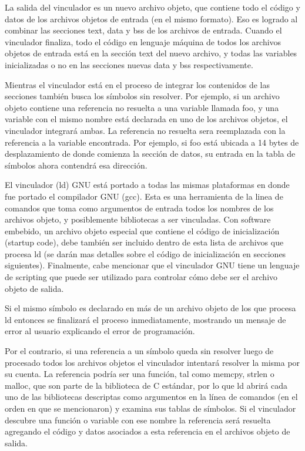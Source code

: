 \documentclass[12pt]{article}
\begin{document}
La salida del vinculador es un nuevo archivo objeto, que contiene todo el código y datos
de los archivos objetos de entrada (en el mismo formato).
Eso es logrado al combinar las secciones text, data y bss de los archivos de entrada.
Cuando el vinculador finaliza, todo el código en lenguaje máquina de todos los archivos
objetos de entrada está en la sección text del nuevo archivo, y todas las variables
inicializadas o no en las secciones nuevas data y bss respectivamente.

Mientras el vinculador está en el proceso de integrar 
los contenidos de las secciones también 
busca los símbolos sin resolver. Por ejemplo, si un archivo objeto contiene 
una referencia no resuelta a  una variable llamada foo, y una variable con 
el mismo nombre está declarada en uno de los archivos objetos, el vinculador
integrará ambas. La referencia no resuelta sera reemplazada con la referencia
a la variable encontrada. Por ejemplo, si foo está ubicada a 14 bytes de desplazamiento
de donde comienza la sección de datos, su entrada en la tabla de símbolos ahora
contendrá esa dirección.

El vinculador (ld) GNU está portado a todas las mismas plataformas en donde
fue portado el compilador GNU (gcc). Esta es una herramienta de la linea de comandos
que toma como argumentos de entrada todos los nombres de los archivos objeto, 
y posiblemente bibliotecas a ser vinculadas.
Con software embebido, un archivo objeto especial que contiene el código de 
inicialización (startup code), debe también ser incluido dentro de esta
lista de archivos que procesa ld (se darán mas detalles sobre el código
de inicialización en secciones siguientes). Finalmente, cabe mencionar
que el vinculador GNU tiene un lenguaje de scripting que puede ser utilizado
para controlar cómo debe ser el archivo objeto de salida.

Si el mismo símbolo es declarado en más de un archivo objeto de los que 
procesa ld entonces se finalizará el proceso inmediatamente, mostrando un mensaje
de error al usuario explicando el error de programación.

Por el contrario, si una referencia a un símbolo queda sin resolver luego de
procesado todos los archivos objetos el vinculador intentará resolver la misma
por su cuenta.
La referencia podría ser una función, tal como memcpy, strlen o malloc, que son
parte de la biblioteca de C estándar, por lo que ld abrirá cada uno de las
bibliotecas descriptas como argumentos en la línea de comandos (en el orden
en que se mencionaron) y examina sus tablas de símbolos. 
Si el vinculador descubre una función o variable con ese nombre la referencia
será resuelta agregando el código y datos asociados a esta referencia en el 
archivos objeto de salida.
\end{document}
